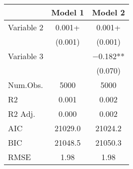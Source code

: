 \begin{table}
\centering
\begin{tabular}[t]{lcc}
\toprule
  & Model 1 & Model 2\\
\midrule
Variable 2 & \num{0.001}+ & \num{0.001}+\\
 & (\num{0.001}) & (\num{0.001})\\
Variable 3 &  & \num{-0.182}**\\
 &  & (\num{0.070})\\
\midrule
Num.Obs. & \num{5000} & \num{5000}\\
R2 & \num{0.001} & \num{0.002}\\
R2 Adj. & \num{0.000} & \num{0.002}\\
AIC & \num{21029.0} & \num{21024.2}\\
BIC & \num{21048.5} & \num{21050.3}\\
RMSE & \num{1.98} & \num{1.98}\\
\bottomrule
\end{tabular}
\end{table}
